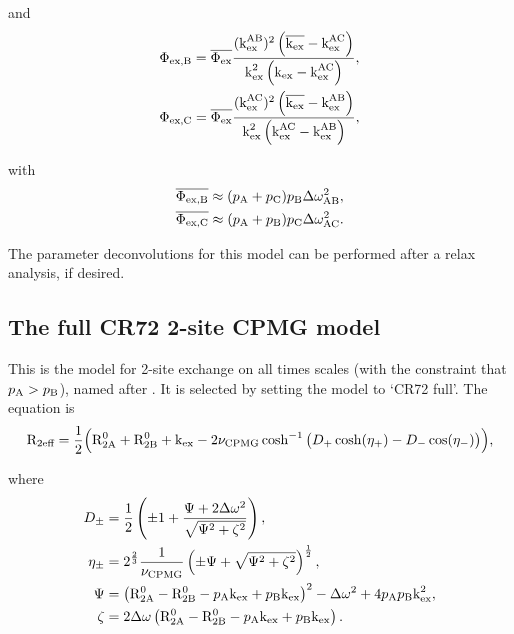 and
\begin{subequations}
\begin{align}
    &\Phi_\textrm{ex,B} = \overline{\Phi_\textrm{ex}} \frac{(\textrm{k}_\textrm{ex}^\textrm{AB})^2 \left( \overline{\textrm{k}_\textrm{ex}} - \textrm{k}_\textrm{ex}^\textrm{AC} \right)}{\textrm{k}_\textrm{ex}^2 \left( \textrm{k}_\textrm{ex} - \textrm{k}_\textrm{ex}^\textrm{AC} \right)} , \label{eq: disp phiexB} \\
    &\Phi_\textrm{ex,C} = \overline{\Phi_\textrm{ex}} \frac{(\textrm{k}_\textrm{ex}^\textrm{AC})^2 \left( \overline{\textrm{k}_\textrm{ex}} - \textrm{k}_\textrm{ex}^\textrm{AB} \right)}{\textrm{k}_\textrm{ex}^2 \left( \textrm{k}_\textrm{ex}^\textrm{AC} - \textrm{k}_\textrm{ex}^\textrm{AB} \right)} , \label{eq: disp phiexC}
\end{align}
\end{subequations}

with
\begin{subequations}
\begin{align}
    &\overline{\Phi_\textrm{ex,B}} \approx (p_\textrm{A} + p_\textrm{C}) p_\textrm{B} \Delta\omega_\textrm{AB}^2 , \\
    &\overline{\Phi_\textrm{ex,C}} \approx (p_\textrm{A} + p_\textrm{B}) p_\textrm{C} \Delta\omega_\textrm{AC}^2 .
\end{align}
\end{subequations}

The parameter deconvolutions for this model can be performed after a relax analysis, if desired.




\subsection{The full CR72 2-site CPMG model}
\label{sect: dispersion: CR72 full model}

This is the model for 2-site exchange on all times scales (with the constraint that $p_\textrm{A} > p_\textrm{B}$), named after \citet{CarverRichards72}.
It is selected by setting the model to `CR72 full'.
The equation is
\begin{equation}
    \mathrm{R}_\textrm{2eff} = \frac{1}{2} \Big( \mathrm{R}_\mathrm{2A}^0 + \mathrm{R}_\mathrm{2B}^0 + \textrm{k}_\textrm{ex} - 2\nu_\textrm{CPMG}\cosh^{-1} \big( D_+\cosh(\eta_+) - D_-\cos(\eta_-) \big) \Big) ,
\end{equation}

where
\begin{align}
    D_\pm    &= \frac{1}{2} \left( \pm1 + \frac{\Psi + 2\Delta\omega^2}{\sqrt{\Psi^2 + \zeta^2}} \right) , \\
    \eta_\pm &= 2^{\frac{2}{3}}\frac{1}{\nu_\textrm{CPMG}} \left( \pm\Psi + \sqrt{\Psi^2 + \zeta^2} \right)^{\frac{1}{2}} , \\
    \Psi     &= \left( \mathrm{R}_\mathrm{2A}^0 - \mathrm{R}_\mathrm{2B}^0 - p_\textrm{A}\textrm{k}_\textrm{ex} + p_\textrm{B}\textrm{k}_\textrm{ex} \right)^2 - \Delta\omega^2 + 4p_\textrm{A}p_\textrm{B}\textrm{k}_\textrm{ex}^2 , \\
    \zeta    &= 2\Delta\omega \left( \mathrm{R}_\mathrm{2A}^0 - \mathrm{R}_\mathrm{2B}^0 - p_\textrm{A}\textrm{k}_\textrm{ex} + p_\textrm{B}\textrm{k}_\textrm{ex} \right).
\end{align}

